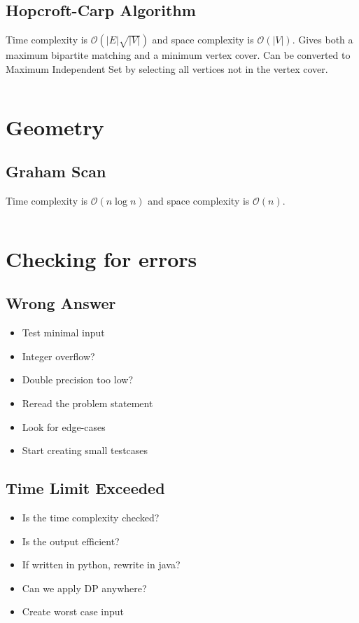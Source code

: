\documentclass[8pt,a4paper,landscape,oneside]{amsart}
\newcommand{\code}[1]{\inputminted[fontsize=\normalsize,baselinestretch=1]{java}{code/#1}}
\newcommand{\bigO}{\mathcal{O}}
\begin{document}
\begin{multicols*}{3}
  \subsection{Hopcroft-Carp Algorithm}
  Time complexity is $\bigO(|E|\sqrt{|V|})$ and space complexity is $\bigO(|V|)$. Gives both a maximum bipartite matching and a minimum vertex cover. Can be converted to Maximum Independent Set by selecting all vertices not in the vertex cover.
  \code{Graphs/HopcroftCarp.java}
  
  
\section{Geometry}
  \subsection{Graham Scan}
  Time complexity is $\bigO(n\log{n})$ and space complexity is $\bigO(n)$.
  \code{Geometry/GrahamScan.java}  
        
        
\section{Checking for errors}
  \subsection{Wrong Answer}
    \begin{itemize}
    \item Test minimal input
    \item Integer overflow?
    \item Double precision too low?
    \item Reread the problem statement
    \item Look for edge-cases
    \item Start creating small testcases
    \end{itemize}
  \subsection{Time Limit Exceeded}
    \begin{itemize}
    \item Is the time complexity checked?
    \item Is the output efficient?
    \item If written in python, rewrite in java?
    \item Can we apply DP anywhere?
    \item Create worst case input
    \end{itemize}

\end{multicols*}
\end{document}
